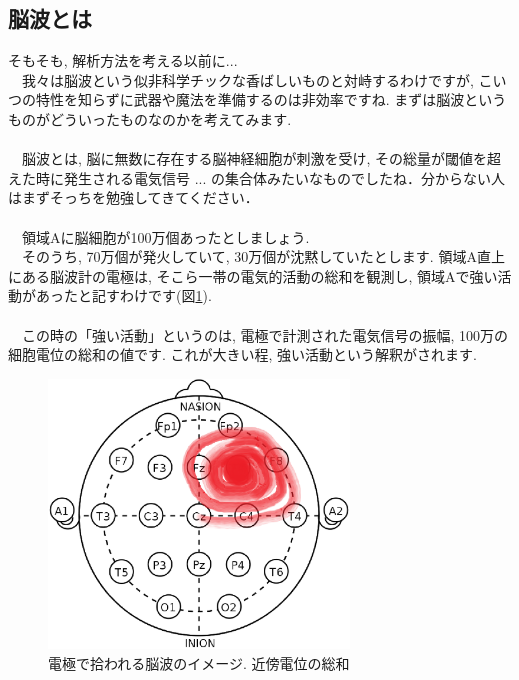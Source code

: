 \documentclass[11pt,a4paper]{ujreport} 	%
\begin{document}
\subsection{脳波とは}
そもそも, 解析方法を考える以前に...\\
　我々は脳波という似非科学チックな香ばしいものと対峙するわけですが, こいつの特性を知らずに武器や魔法を準備するのは非効率ですね. まずは脳波というものがどういったものなのかを考えてみます. \\
\\
　脳波とは, 脳に無数に存在する脳神経細胞が刺激を受け, その総量が閾値を超えた時に発生される電気信号 ... の集合体みたいなものでしたね．分からない人はまずそっちを勉強してきてください．\\
\\
　領域Aに脳細胞が100万個あったとしましょう. \\
　そのうち, 70万個が発火していて, 30万個が沈黙していたとします. 領域A直上にある脳波計の電極は, そこら一帯の電気的活動の総和を観測し, 領域Aで強い活動があったと記すわけです(図\ref{im:topo}).\\
\\
　この時の「強い活動」というのは, 電極で計測された電気信号の振幅, 100万の細胞電位の総和の値です. これが大きい程, 強い活動という解釈がされます.\\

\begin{figure}[H]
\label{im:topo}
  \centering
  \includegraphics[width=8cm]{../figures/topomap.eps}
  \caption{電極で拾われる脳波のイメージ. 近傍電位の総和}
\end{figure}
\end{document}
